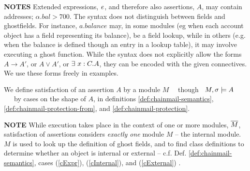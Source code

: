 \noindent
\textbf{NOTES}  \notesep Extended expressions, $\mathit{e}$, and therefore also assertions, $A$, may contain addresses; \eg   $\alpha.bal > 700$. 
\notesep The syntax does  not distinguish between fields and ghostfields. For instance, $a.balance$ may, in some modules (eg when each account object has a field representing its balance), be a field lookup, while in others (e.g. when the balance is defined though an entry in a lookup table),  it may involve executing a ghost function. 
\notesep While the syntax does not explicitly allow the forms $A\rightarrow A'$, or $A \vee A'$, or ${\exists\ x:C.A}$, they can be encoded with the given connectives. We use these forms freely in examples.


\begin{definition} 
\label{def:chainmail-semantics-all}
\label{def:chainmail-semantics}
We define satisfaction of an assertion $A$ by a %
 module $M$ \ \  though \ $M , \sigma \models {A}$ \ \ \ by cases on the shape of $A$, in definitions \ref{def:chainmail-semantics}, \ref{def:chainmail-protection-from}, and 
 \ref{def:chainmail-protection}.
\end{definition}

\noindent
\textbf{NOTE}  While execution takes place in the context of one or more modules, $\overline{M}$, satisfaction of assertions considers \emph{exactly one} module  $M$ -- the internal module. 
$M$ is used %
 to look up the definition of ghost fields, and to find class definitions to determine whether an object is internal or external
-- c.f. Def. \ref{def:chainmail-semantics}, cases (\ref{cExpr}),  (\ref{cInternal}),  and (\ref{cExternal}) .

